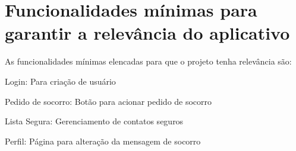 \section{Funcionalidades mínimas para garantir a relevância do aplicativo}
As funcionalidades mínimas elencadas para que o projeto tenha relevância são:
\begin{alineas}
  \item Login: Para criação de usuário
  \item Pedido de socorro: Botão para acionar pedido de socorro
  \item Lista Segura: Gerenciamento de contatos seguros
  \item Perfil: Página para alteração da mensagem de socorro

\end{alineas}
